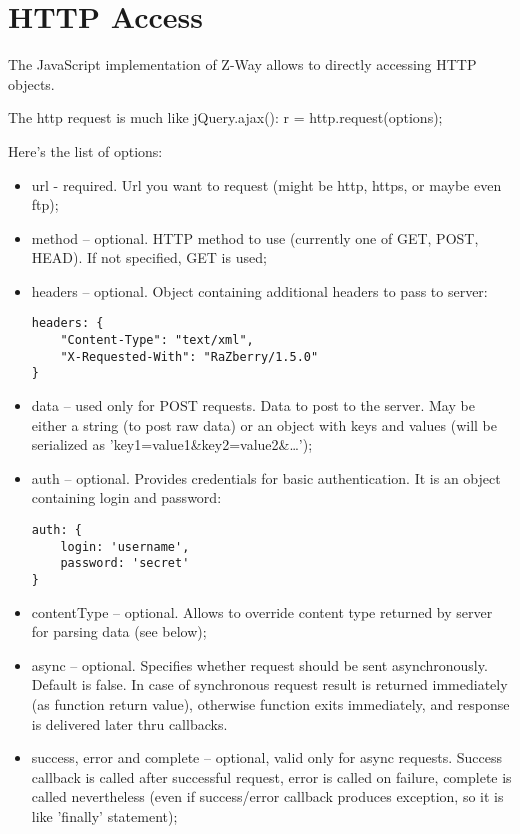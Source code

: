 \section{HTTP Access}

The JavaScript implementation of Z-Way allows to directly accessing HTTP objects.

The http request is much like jQuery.ajax(): r = http.request(options);

Here's the list of options:
\begin{itemize}
\item url - required. Url you want to request (might be http, https, or maybe even ftp);
\item method – optional. HTTP method to use (currently one of GET, POST, HEAD). If not 
specified, GET is used;
\item headers – optional. Object containing additional headers to pass to server:

\begin{lstlisting}
headers: {
    "Content-Type": "text/xml",
    "X-Requested-With": "RaZberry/1.5.0"
}
\end{lstlisting}

\item data – used only for POST requests. Data to post to the server. May be either a
string (to post raw data) or an object with keys and values (will be serialized as 
'key1=value1\&key2=value2\&…');
\item auth – optional. Provides credentials for basic authentication. It is an object 
containing login and password:
\begin{lstlisting}
auth: {
    login: 'username',
    password: 'secret'
}
\end{lstlisting}
\item contentType – optional. Allows to override content type returned by server for 
parsing data (see below);
\item async – optional. Specifies whether request should be sent asynchronously. Default 
is false. In case of synchronous request result is returned immediately (as function 
return value), otherwise function exits immediately, and response is delivered later 
thru callbacks.
\item success, error and complete – optional, valid only for async requests. Success 
callback is called after successful request, error is called on failure, complete is 
called nevertheless (even if success/error callback produces exception, so it is like 
'finally' statement);
\end{itemize}

